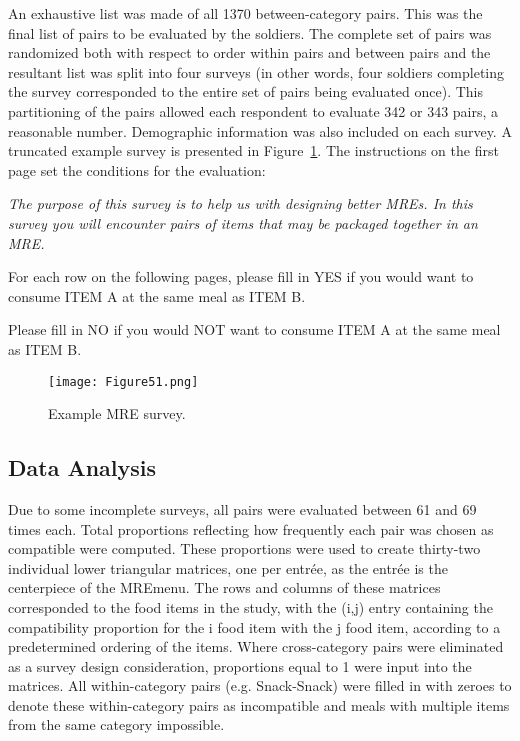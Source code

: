 An exhaustive list was made of all 1370 between-category pairs.  This was the final list of pairs to be evaluated by the soldiers.  The complete set of pairs was randomized both with respect to order within pairs and between pairs and the resultant list was split into four surveys (in other words, four soldiers completing the survey corresponded to the entire set of pairs being evaluated once).  This partitioning of the pairs allowed each respondent to evaluate 342 or 343 pairs, a reasonable number.  Demographic information was also included on each survey.  A truncated example survey is presented in Figure~\ref{fig:mresurvey}.  The instructions on the first page set the conditions for the evaluation:

\noindent
{\it The purpose of this survey is to help us with designing better MREs. In this survey you will encounter pairs of items that may be packaged together in an MRE.

\noindent
For each row on the following pages, please fill in YES if you would want to consume ITEM A at the same meal as ITEM B.

\noindent
Please fill in NO if you would NOT want to consume ITEM A at the same meal as ITEM B.}

\begin{figure}[h!]
\caption{Example MRE survey.}
\label{fig:mresurvey}
\centering
\texttt{[image: Figure51.png]}
\end{figure}

\subsection{Data Analysis}
Due to some incomplete surveys, all pairs were evaluated between 61 and 69 times each.  Total proportions reflecting how frequently each pair was chosen as compatible were computed.  These proportions were used to create thirty-two individual lower triangular matrices, one per entrée, as the entrée is the centerpiece of the MRE\tm menu.  The rows and columns of these matrices corresponded to the food items in the study, with the (i,j) entry containing the compatibility proportion for the i food item with the j food item, according to a predetermined ordering of the items.  Where cross-category pairs were eliminated as a survey design consideration, proportions equal to 1 were input into the matrices.  All within-category pairs (e.g. Snack-Snack) were filled in with zeroes to denote these within-category pairs as incompatible and meals with multiple items from the same category impossible.

